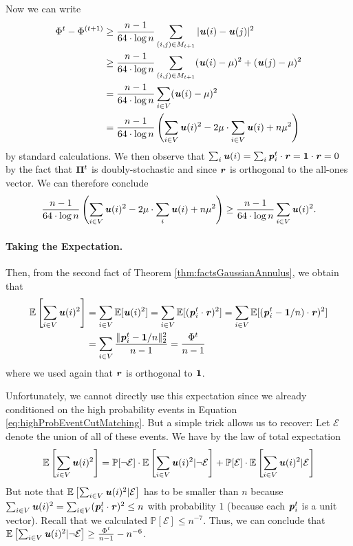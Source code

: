 Now we can write 
\begin{align*}
     \Phi^{t} - \Phi^{(t+1)} &\geq \frac{n-1}{64 \cdot \log n} \sum_{(i,j) \in M_{t+1}} |\boldsymbol{\mathit{u}}(i) - \boldsymbol{\mathit{u}}(j)|^2 \\
     &\geq  \frac{n-1}{64 \cdot \log n} \sum_{(i,j) \in M_{t+1}}  (\boldsymbol{\mathit{u}}(i) - \mu)^2 + (\boldsymbol{\mathit{u}}(j) - \mu)^2\\
     &=  \frac{n-1}{64 \cdot \log n} \sum_{i \in V}  (\boldsymbol{\mathit{u}}(i) - \mu)^2\\
     &=  \frac{n-1}{64 \cdot \log n}\left( \sum_{i \in V} \boldsymbol{\mathit{u}}(i)^2 - 2\mu \cdot \sum_{i \in V} \boldsymbol{\mathit{u}}(i) + n \mu^2 \right)
\end{align*}
by standard calculations. We then observe that $\sum_i \boldsymbol{\mathit{u}}(i) = \sum_i \boldsymbol{\mathit{p}}_i^t \cdot \boldsymbol{\mathit{r}} = \boldsymbol{1} \cdot \boldsymbol{\mathit{r}} = 0$ by the fact that $\boldsymbol{\Pi}^t$ is doubly-stochastic and since $\boldsymbol{\mathit{r}}$ is orthogonal to the all-ones vector. We can therefore conclude 
\begin{equation}\label{eq:highProbBound}
\frac{n-1}{64 \cdot \log n}\left( \sum_{i \in V} \boldsymbol{\mathit{u}}(i)^2 - 2\mu \cdot \sum_i \boldsymbol{\mathit{u}}(i) + n \mu^2 \right) \geq \frac{n-1}{64 \cdot \log n} \sum_{i \in V} \boldsymbol{\mathit{u}}(i)^2.
\end{equation}

\paragraph{Taking the Expectation.} Then, from the second fact of Theorem \ref{thm:factsGaussianAnnulus}, we obtain that 
\begin{align}\label{eq:potentialReductionExp}
\mathbb{E}\left[\sum_{i \in V} \boldsymbol{\mathit{u}}(i)^2\right] &= \sum_{i \in V} \mathbb{E}[\boldsymbol{\mathit{u}}(i)^2] = \sum_{i \in V} \mathbb{E}[(\boldsymbol{\mathit{p}}_i^t \cdot \boldsymbol{\mathit{r}})^2] = \sum_{i \in V} \mathbb{E}[(\boldsymbol{\mathit{p}}_i^t - \boldsymbol{1}/n) \cdot \boldsymbol{\mathit{r}})^2] \\ &= \sum_{i \in V} \frac{\|\boldsymbol{\mathit{p}}_i^t - \boldsymbol{1}/n\|_2^2}{n-1} = \frac{\Phi^t}{n-1}
\end{align}
where we used again that $\boldsymbol{\mathit{r}}$ is orthogonal to $\boldsymbol{1}$.

Unfortunately, we cannot directly use this expectation since we already conditioned on the high probability events in Equation \eqref{eq:highProbEventCutMatching}. But a simple trick allows us to recover: Let $\mathcal{E}$ denote the union of all of these events. We have by the law of total expectation
\[
\mathbb{E}\left[\sum_{i \in V} \boldsymbol{\mathit{u}}(i)^2 \right] = \mathbb{P}[\neg \mathcal{E}] \cdot \mathbb{E}\left[\sum_{i \in V} \boldsymbol{\mathit{u}}(i)^2 | \neg \mathcal{E} \right] + \mathbb{P}[\mathcal{E}] \cdot \mathbb{E}\left[\sum_{i \in V} \boldsymbol{\mathit{u}}(i)^2 | \mathcal{E} \right]
\]
But note that $\mathbb{E}\left[\sum_{i \in V} \boldsymbol{\mathit{u}}(i)^2 | \mathcal{E} \right]$ has to be smaller than $n$ because $\sum_{i \in V} \boldsymbol{\mathit{u}}(i)^2 = \sum_{i \in V} (\boldsymbol{\mathit{p}}_i^t \cdot \boldsymbol{\mathit{r}})^2 \leq n$ with probability $1$ (because each $\boldsymbol{\mathit{p}}_i^t$ is a unit vector). Recall that we calculated $\mathbb{P}[\mathcal{E}] \leq n^{-7}$. Thus, we can conclude that $\mathbb{E}\left[\sum_{i \in V} \boldsymbol{\mathit{u}}(i)^2 | \neg \mathcal{E} \right] \geq \frac{\Phi^t}{n-1} - n^{-6}$.

